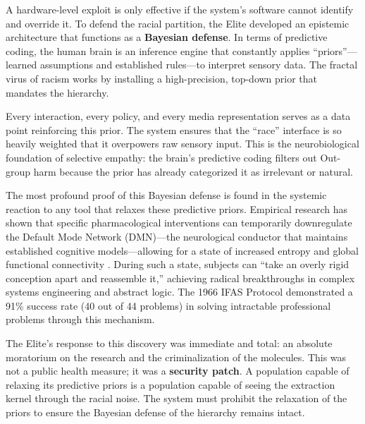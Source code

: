 \documentclass[12pt,openany]{book}
\begin{document}
A hardware-level exploit is only effective if the system's software cannot identify and override it. To defend the racial partition, the Elite developed an epistemic architecture that functions as a \textbf{Bayesian defense}. In terms of predictive coding, the human brain is an inference engine that constantly applies ``priors''---learned assumptions and established rules---to interpret sensory data. The fractal virus of racism works by installing a high-precision, top-down prior that mandates the hierarchy.

Every interaction, every policy, and every media representation serves as a data point reinforcing this prior. The system ensures that the ``race'' interface is so heavily weighted that it overpowers raw sensory input. This is the neurobiological foundation of selective empathy: the brain's predictive coding filters out Out-group harm because the prior has already categorized it as irrelevant or natural. 

The most profound proof of this Bayesian defense is found in the systemic reaction to any tool that relaxes these predictive priors. Empirical research has shown that specific pharmacological interventions can temporarily downregulate the Default Mode Network (DMN)---the neurological conductor that maintains established cognitive models---allowing for a state of increased entropy and global functional connectivity \cite{ifas_1966}. During such a state, subjects can ``take an overly rigid conception apart and reassemble it,'' achieving radical breakthroughs in complex systems engineering and abstract logic. The 1966 IFAS Protocol demonstrated a 91\% success rate (40 out of 44 problems) in solving intractable professional problems through this mechanism.

The Elite's response to this discovery was immediate and total: an absolute moratorium on the research and the criminalization of the molecules. This was not a public health measure; it was a \textbf{security patch}. A population capable of relaxing its predictive priors is a population capable of seeing the extraction kernel through the racial noise. The system must prohibit the relaxation of the priors to ensure the Bayesian defense of the hierarchy remains intact.
\end{document}
